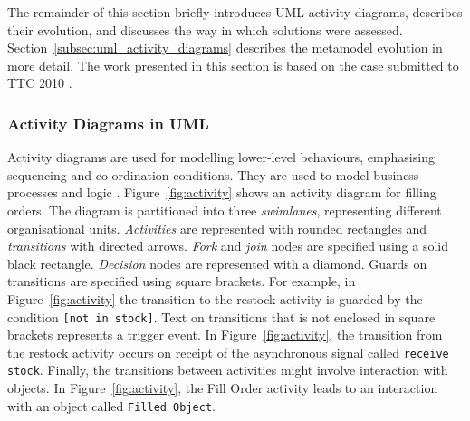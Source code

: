 The remainder of this section briefly introduces UML activity diagrams, describes their evolution, and discusses the way in which solutions were assessed. Section~\ref{subsec:uml_activity_diagrams} describes the metamodel evolution in more detail. The work presented in this section is based on the case submitted to TTC 2010 \cite{rose10ttc_case}. 

\subsubsection{Activity Diagrams in UML}
Activity diagrams are used for modelling lower-level behaviours, emphasising sequencing and co-ordination conditions. They are used to model business processes and logic \cite{uml22}. Figure~\ref{fig:activity} shows an activity diagram for filling orders. The diagram is partitioned into three \emph{swimlanes}, representing different organisational units. \emph{Activities} are represented with rounded rectangles and \emph{transitions} with directed arrows. \emph{Fork} and \emph{join} nodes are specified using a solid black rectangle. \emph{Decision} nodes are represented with a diamond. Guards on transitions are specified using square brackets. For example, in Figure~\ref{fig:activity} the transition to the restock activity is guarded by the condition \texttt{[not in stock]}. Text on transitions that is not enclosed in square brackets represents a trigger event. In Figure~\ref{fig:activity}, the transition from the restock activity occurs on receipt of the asynchronous signal called \texttt{receive stock}. Finally, the transitions between activities might involve interaction with objects. In Figure~\ref{fig:activity}, the Fill Order activity leads to an interaction with an object called \texttt{Filled Object}. 


